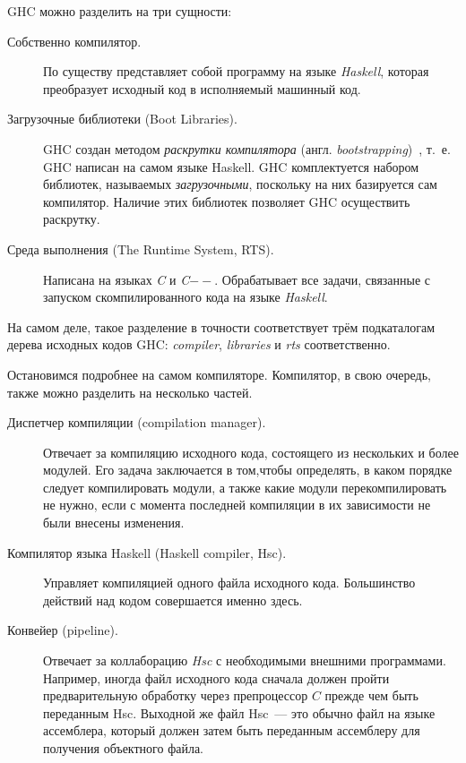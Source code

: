 GHC можно разделить на три сущности:
\begin{description}
\item[Собственно компилятор.] По существу представляет собой программу на языке \textit{Haskell}, которая преобразует исходный код в исполняемый машинный код.
\item[Загрузочные библиотеки (Boot Libraries).] GHC создан методом \textit{раскрутки компилятора} (англ. \textit{bootstrapping})~\autocite{wikiGHC}, т.~е. GHC написан на самом языке Haskell. GHC комплектуется набором библиотек, называемых \textit{загрузочными}, поскольку на них базируется сам компилятор. Наличие этих библиотек позволяет GHC осуществить раскрутку.
\item[Среда выполнения (The Runtime System, RTS).] Написана на языках \textit{C} и \textit{C$--$}. Обрабатывает все задачи, связанные с запуском скомпилированного кода на языке \textit{Haskell}.
\end{description}
На самом деле, такое разделение в точности соответствует трём подкаталогам дерева исходных кодов GHC: \textit{compiler}, \textit{libraries} и \textit{rts} соответственно.

Остановимся подробнее на самом компиляторе. Компилятор, в свою очередь, также можно разделить на несколько частей.
\begin{description}
\item[Диспетчер компиляции (compilation manager).] Отвечает за компиляцию исходного кода, состоящего из нескольких и более модулей. Его задача заключается в том,чтобы определять, в каком порядке следует компилировать модули, а также какие модули перекомпилировать не нужно, если с момента последней компиляции в их зависимости не были внесены изменения.
\item[Компилятор языка Haskell (Haskell compiler, Hsc).] Управляет компиляцией одного файла исходного кода. Большинство действий над кодом совершается именно здесь.
\item[Конвейер (pipeline).] Отвечает за коллаборацию \textit{Hsc} с необходимыми внешними программами. Например, иногда файл исходного кода сначала должен пройти предварительную обработку через препроцессор $C$ прежде чем быть переданным Hsc. Выходной же файл Hsc~--- это обычно файл на языке ассемблера, который должен затем быть переданным ассемблеру для получения объектного файла.
\end{description}



